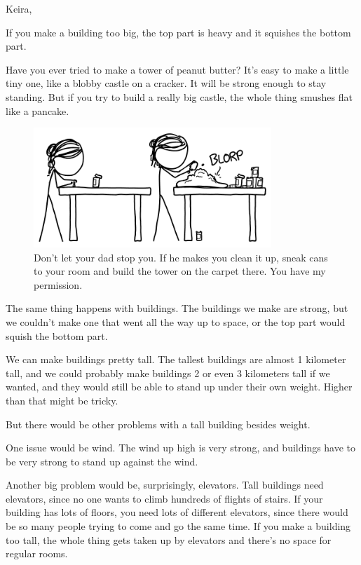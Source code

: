 {\hfill{}

{Keira,}

{If you make a building too big, the top part is heavy and it squishes the bottom part.}

{Have you ever tried to make a tower of peanut butter? It's easy to make a little tiny one, like a blobby castle on a cracker. It will be strong enough to stay standing. But if you try to build a really big castle, the whole thing smushes flat like a pancake.}

\begin{figure}[!htbp]
\centering
\includegraphics[scale=0.5, max width=0.8\textwidth]{imgs/a/94/billion_pb.png}
\caption{Don't let your dad stop you. If he makes you clean it up, sneak cans to your room and build the tower on the carpet there. You have my permission.}
\end{figure}

{The same thing happens with buildings. The buildings we make are strong, but we couldn't make one that went all the way up to space, or the top part would squish the bottom part.}

{We can make buildings pretty tall. The tallest buildings are almost 1 kilometer tall, and we could probably make buildings 2 or even 3 kilometers tall if we wanted, and they would still be able to stand up under their own weight. Higher than that might be tricky.}

{But there would be other problems with a tall building besides weight.}

{One issue would be wind. The wind up high is very strong, and buildings have to be very strong to stand up against the wind.}

{Another big problem would be, surprisingly, elevators. Tall buildings need elevators, since no one wants to climb hundreds of flights of stairs. If your building has lots of floors, you need lots of different elevators, since there would be so many people trying to come and go the same time. If you make a building too tall, the whole thing gets taken up by elevators and there's no space for regular rooms.}

}
